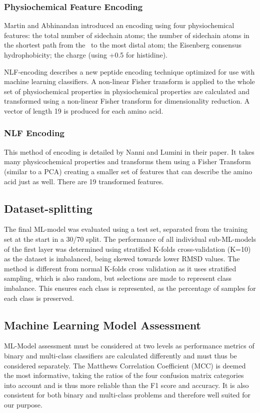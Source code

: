\subsubsection{Physiochemical Feature Encoding}
Martin and Abhinandan introduced an encoding using
four physiochemical features:
the total number of sidechain atoms; the
number of sidechain atoms in the shortest path from the \ca\ to the most
distal atom; the Eisenberg consensus
hydrophobicity\cite{Eisenberg1982}; the charge (using +0.5 for histidine).

NLF-encoding  describes a new peptide encoding technique optimized for use with machine learning classifiers. A non-linear Fisher transform is applied to the whole set of physiochemical properties in 
physiochemical properties are calculated and transformed using a
non-linear Fisher transform for dimensionality reduction.  A vector of
length 19 is produced for each amino acid.



\subsubsection{NLF Encoding}
This method of encoding is detailed by Nanni and Lumini in their paper. It takes many physicochemical properties and transforms them using a Fisher Transform (similar to a PCA) creating a smaller set of features that can describe the amino acid just as well. There are 19 transformed features. 

\subsection{Dataset-splitting}
The final ML-model was evaluated using a test set, separated from the
training set at the start in a 30/70 split. The performance of all individual sub-ML-models of the first layer was determined using stratified K-folds cross-validation (K=10) as the
dataset is imbalanced, being skewed towards lower RMSD values\cite{Krstajic2014,Kohavi1995}. The
method is different from normal K-folds cross validation as it uses
stratified sampling, which is also random, but selections are made to represent class imbalance.
This ensures each class is represented, as the percentage of samples for each class is
preserved.

\subsection{Machine Learning Model Assessment} 
ML-Model assessment must be considered at two levels as performance
metrics of binary and multi-class classifiers are calculated
differently and must thus be considered separately. The Matthews
Correlation Coefficient (MCC)\cite{Chicco2020} is deemed the most
informative, taking the ratios of the four confusion matrix categories
into account and is thus more reliable than the F1 score and
accuracy. It is also consistent for both binary and multi-class
problems and therefore well suited for our purpose.\cite{Jurman2012}
 
